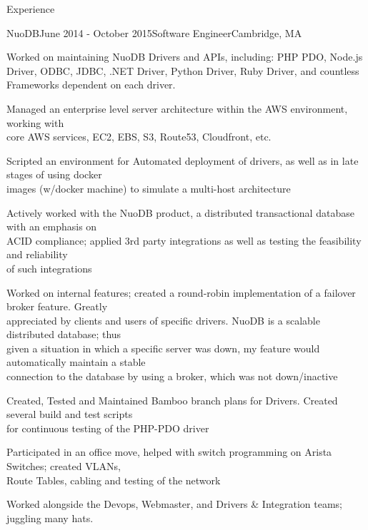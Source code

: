 \documentclass{resume} %
\begin{document}
\begin{rSection}{Experience}
\begin{rSubsection}{NuoDB}{June 2014 - October 2015}{Software Engineer}{Cambridge, MA}
 \item Worked on maintaining NuoDB Drivers and APIs, including: PHP PDO, Node.js Driver, ODBC, JDBC, .NET Driver, Python Driver, Ruby Driver, and countless Frameworks dependent on each driver. 
	      \item Managed an enterprise level server architecture within the AWS environment, working with 
	      \\core AWS services, EC2, EBS, S3, Route53, Cloudfront, etc. 
          \item Scripted an environment for Automated deployment of drivers, as well as in late stages of using docker\\ images (w/docker machine) to simulate a multi-host architecture
          \item Actively worked with the NuoDB product, a distributed transactional database with an emphasis on\\ ACID compliance; applied 3rd party integrations as well as testing the feasibility and reliability\\ of such integrations
   	\item Worked on internal features; created a round-robin implementation of a failover broker feature. Greatly \\appreciated by clients and users of specific drivers. NuoDB is a scalable distributed database; thus\\ given a situation in which a specific server was down, my feature would automatically maintain a stable\\ connection to the database by using a broker, which was not down/inactive
          \item Created, Tested and Maintained Bamboo branch plans for Drivers. Created several build and test scripts\\ for continuous testing of the PHP-PDO driver
          \item Participated in an office move, helped with switch programming on Arista Switches; created VLANs, \\Route Tables, cabling and testing of the network
          \item Worked alongside the Devops, Webmaster, and Drivers \& Integration teams; juggling many hats.
\end{rSubsection}



\end{rSection}
\end{document}
